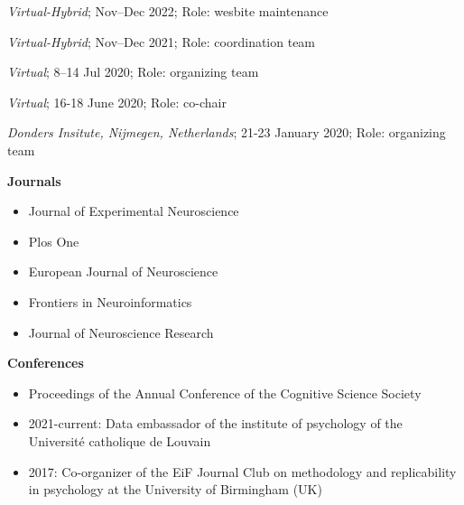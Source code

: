 
\textit{Virtual-Hybrid}; 
Nov--Dec 2022;
Role: wesbite maintenance

\textit{Virtual-Hybrid}; 
Nov--Dec 2021;
Role: coordination team

%
\textit{Virtual}; 
8--14 Jul 2020;
Role: organizing team

%
\textit{Virtual}; 
16-18 June 2020;
Role: co-chair

%
\textit{Donders Insitute, Nijmegen, Netherlands}; 
21-23 January 2020;
Role: organizing team



\textbf{Journals}

\begin{itemize}
    \item Journal of Experimental Neuroscience
    \item Plos One 
    \item European Journal of Neuroscience
    \item Frontiers in Neuroinformatics
    \item Journal of Neuroscience Research
\end{itemize}

\textbf{Conferences}

\begin{itemize}
    \item Proceedings of the Annual Conference of the Cognitive Science Society
\end{itemize}



\begin{itemize}
    \item 2021-current: Data embassador of the institute of psychology of the Université catholique de Louvain
    \item 2017: Co-organizer of the EiF Journal Club on methodology and replicability in psychology at the University of Birmingham (UK)
\end{itemize}


